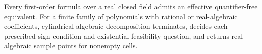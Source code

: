 Every first-order formula over a real closed field admits an effective quantifier-free equivalent.  For a finite family of polynomials with rational or real-algebraic coefficients, cylindrical algebraic decomposition terminates, decides each prescribed sign condition and existential feasibility question, and returns real-algebraic sample points for nonempty cells.